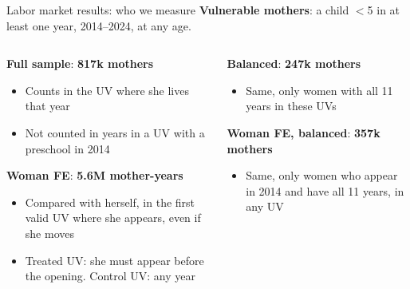 \documentclass[aspectratio=169,10pt]{beamer}
\newcommand{\takeaway}[1]{\par\vspace{6pt}{\small\textcolor{steel}{$\Rightarrow$}\ \textbf{\textcolor{navy}{#1}}}}
\begin{document}
\begin{frame}{Labor market results: who we measure}
\vspace{4pt}
{\small \textbf{Vulnerable mothers}: a child $<$5 in at least one year, 2014--2024, at any age.}
\vspace{6pt}
\begin{columns}[T]
\begin{column}{0.48\textwidth}
{\small\textcolor{steel}{\textbf{Full sample}}: \textbf{817k mothers}}
\begin{itemize}
  \footnotesize
  \item Counts in the UV where she lives that year
  \item Not counted in years in a UV with a preschool in 2014
\end{itemize}
\vspace{4pt}
{\small\textcolor{steel}{\textbf{Woman FE}}: \textbf{5.6M mother-years}}
\begin{itemize}
  \footnotesize
  \item Compared with herself, in the first valid UV where she appears, even if she moves
  \item Treated UV: she must appear before the opening. Control UV: any year
\end{itemize}
\end{column}
\begin{column}{0.48\textwidth}
{\small\textcolor{steel}{\textbf{Balanced}}: \textbf{247k mothers}}
\begin{itemize}
  \footnotesize
  \item Same, only women with all 11 years in these UVs
\end{itemize}
\vspace{24pt}
{\small\textcolor{steel}{\textbf{Woman FE, balanced}}: \textbf{357k mothers}}
\begin{itemize}
  \footnotesize
  \item Same, only women who appear in 2014 and have all 11 years, in any UV
\end{itemize}
\end{column}
\end{columns}
\takeaway{The same mothers, measured four ways: from the UV where they live to each mother against herself.}
\end{frame}
\end{document}

